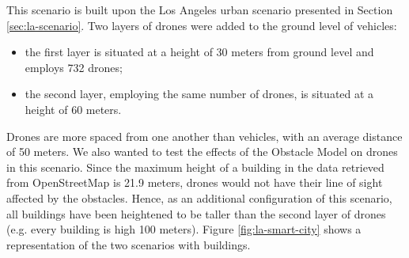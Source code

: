		
		This scenario is built upon the Los Angeles urban scenario presented in Section \ref{sec:la-scenario}. Two layers of drones were added to the ground level of vehicles: 
		\begin{itemize}
			\item the first layer is situated at a height of 30 meters from ground level and employs 732 drones;
			\item the second layer, employing the same number of drones, is situated at a height of 60 meters.
		\end{itemize}
		Drones are more spaced from one another than vehicles, with an average distance of 50 meters. We also wanted to test the effects of the Obstacle Model on drones in this scenario. Since the maximum height of a building in the data retrieved from OpenStreetMap is 21.9 meters, drones would not have their line of sight affected by the obstacles. Hence, as an additional configuration of this scenario, all buildings have been heightened to be taller than the second layer of drones (e.g. every building is high 100 meters). Figure \ref{fig:la-smart-city} shows a representation of the two scenarios with buildings.
		
